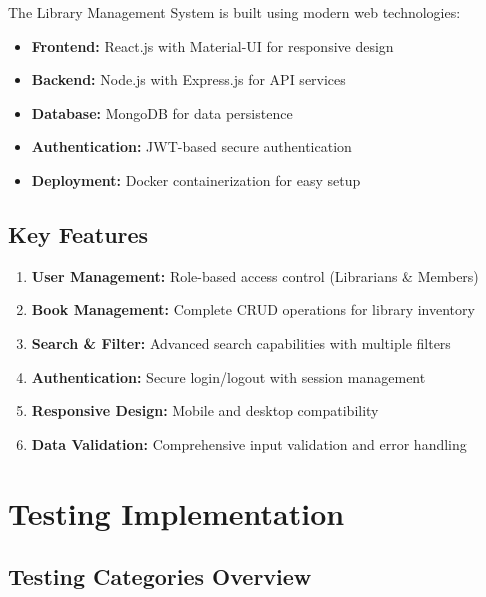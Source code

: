\documentclass[12pt,a4paper]{article}
\begin{document}
The Library Management System is built using modern web technologies:

\begin{itemize}[leftmargin=*]
    \item \textbf{Frontend:} React.js with Material-UI for responsive design
    \item \textbf{Backend:} Node.js with Express.js for API services
    \item \textbf{Database:} MongoDB for data persistence
    \item \textbf{Authentication:} JWT-based secure authentication
    \item \textbf{Deployment:} Docker containerization for easy setup
\end{itemize}

\subsection{Key Features}

\begin{enumerate}[leftmargin=*]
    \item \textbf{User Management:} Role-based access control (Librarians \& Members)
    \item \textbf{Book Management:} Complete CRUD operations for library inventory
    \item \textbf{Search \& Filter:} Advanced search capabilities with multiple filters
    \item \textbf{Authentication:} Secure login/logout with session management
    \item \textbf{Responsive Design:} Mobile and desktop compatibility
    \item \textbf{Data Validation:} Comprehensive input validation and error handling
\end{enumerate}

\section{Testing Implementation}

\subsection{Testing Categories Overview}
\end{document}
